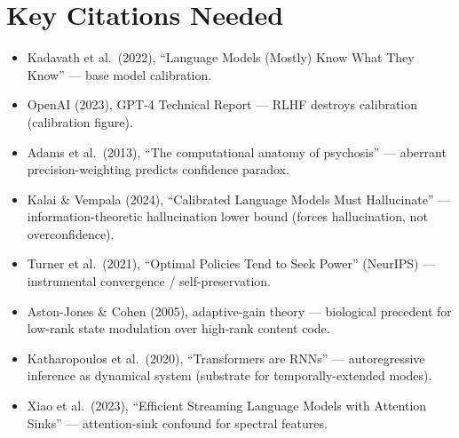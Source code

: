 \documentclass[11pt,letterpaper]{article}
\begin{document}
\section{Key Citations Needed}

\begin{itemize}[nosep]
  \item Kadavath et al.\ (2022), ``Language Models (Mostly) Know What
    They Know'' --- base model calibration.
  \item OpenAI (2023), GPT-4 Technical Report --- RLHF destroys
    calibration (calibration figure).
  \item Adams et al.\ (2013), ``The computational anatomy of
    psychosis'' --- aberrant precision-weighting predicts confidence
    paradox.
  \item Kalai \& Vempala (2024), ``Calibrated Language Models Must
    Hallucinate'' --- information-theoretic hallucination lower bound
    (forces hallucination, not overconfidence).
  \item Turner et al.\ (2021), ``Optimal Policies Tend to Seek Power''
    (NeurIPS) --- instrumental convergence / self-preservation.
  \item Aston-Jones \& Cohen (2005), adaptive-gain theory --- biological
    precedent for low-rank state modulation over high-rank content code.
  \item Katharopoulos et al.\ (2020), ``Transformers are RNNs'' ---
    autoregressive inference as dynamical system (substrate for
    temporally-extended modes).
  \item Xiao et al.\ (2023), ``Efficient Streaming Language Models with
    Attention Sinks'' --- attention-sink confound for spectral features.
\end{itemize}
\end{document}
